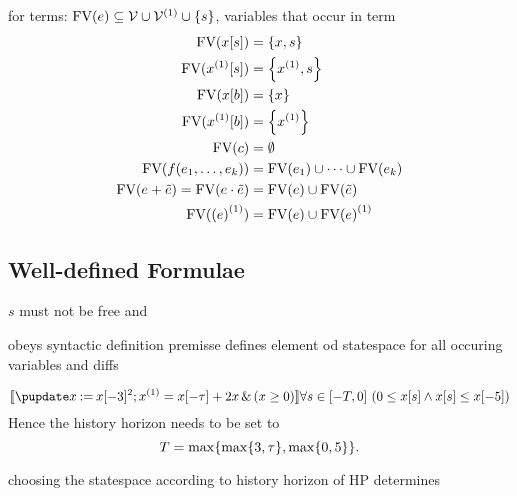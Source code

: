         \begin{definition}
            for terms: $\freevars{\astrm}\subseteq\allvars\cup\diffvars\cup\set{s}$, variables that occur in term
            \begin{align*}
                \freevars{\xtau[s]} &= \set{x,s}\\
                \freevars{\Dxtau[s]} &= \set{\D{x},s}\\
                \freevars{\xtau[b]} &= \set{x}\\
                \freevars{\Dxtau[b]} &= \set{\D{x}}\\
                \freevars{c} &= \emptyset\\
                \freevars{f(\range{\istrm{1}}{\istrm{k}})} &= \freevars{\istrm{1}} \cup\cdots\cup \freevars{\istrm{k}}\\
                \freevars{\astrm + \bstrm} = \freevars{\astrm \cdot \bstrm} &= \freevars{\astrm}\cup\freevars{\bstrm}\\
                \freevars{\D{(\astrm)}} &= \freevars{\astrm}\cup\D{\freevars{\astrm}}
            \end{align*}
                
        \end{definition}    

    \subsection{Well-defined Formulae}
        \label{sec:well-definedness}
    
        $s$ must not be free
        and

        \begin{definition}
            obeys syntactic definition
            premisse defines element od statespace for all occuring variables and diffs
        \end{definition}

        \begin{example}
            \begin{equation*}
                \dbox{\hupdate{\humod{x}{\xtau[-3]^2}};\hevolvein{\D{x}=\xtau+2x}{(x\geq 0)}}{\holdssince{T}{0\leq \xtau[s] \land \xtau[s]\leq\xtau[-5]}}
            \end{equation*}
            Hence the history horizon needs to be set to
            \begin{equation*}
                T=\max\set{\max\set{3,\tau},\max\set{0,5}}.
            \end{equation*}
        \end{example}

        \begin{lemma}
            choosing the statespace according to history horizon of HP determines
        \end{lemma}

        \begin{example}
            
        \end{example}
